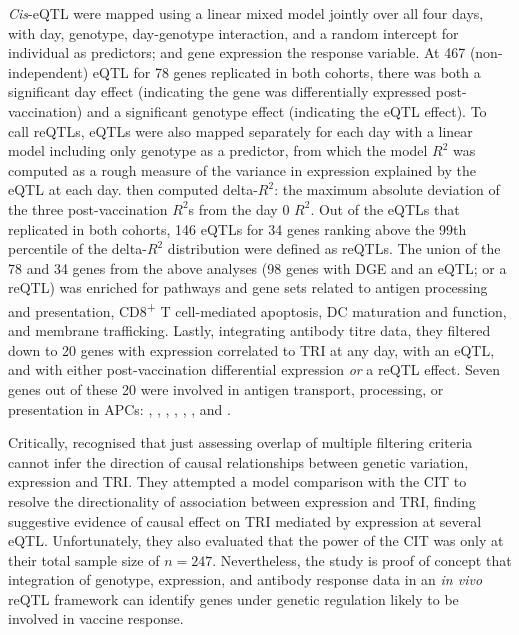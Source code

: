 \textit{Cis}-\gls{eQTL} were mapped using a linear mixed model jointly over all four days,
with day, genotype, day-genotype interaction, and a random intercept for individual as predictors; and gene expression the response variable.
At 467 (non-independent) \gls{eQTL} for 78 genes replicated in both cohorts,
there was both a significant day effect (indicating the gene was differentially expressed post-vaccination)
and a significant genotype effect (indicating the \gls{eQTL} effect).
To call \glspl{reQTL}, \glspl{eQTL} were also mapped separately for each day with a linear model including only genotype as a predictor,
from which the model $R^2$ was computed as a rough measure of the variance in expression explained by the \gls{eQTL} at each day.
\textcite{franco2013IntegrativeGenomicAnalysis} then computed delta-$R^2$: the maximum absolute deviation of the three post-vaccination $R^2$s from the day 0 $R^2$.
Out of the \glspl{eQTL} that replicated in both cohorts, 
146 \glspl{eQTL} for 34 genes ranking above the 99th percentile of the delta-$R^2$ distribution were defined as \glspl{reQTL}.
The union of the 78 and 34 genes from the above analyses (98 genes with \gls{DGE} and an \gls{eQTL}; or a \gls{reQTL}) was enriched for pathways and gene sets related to  
antigen processing and presentation, CD8\textsuperscript{+} T cell-mediated apoptosis, \gls{DC} maturation and function, and membrane trafficking.
%
Lastly, integrating antibody titre data,
they filtered down to 20 genes with expression correlated to \gls{TRI} at any day, 
with an \gls{eQTL}, 
and with either post-vaccination differential expression \emph{or} a \gls{reQTL} effect.
Seven genes out of these 20 were involved in antigen transport, processing, or presentation in \glspl{APC}:
, , , , , , and .

Critically, \textcite{franco2013IntegrativeGenomicAnalysis} recognised that just assessing overlap of multiple filtering criteria cannot infer the direction of causal relationships between genetic variation, expression and \gls{TRI}.
They attempted a model comparison with the CIT \autocite{millstein2009DisentanglingMolecularRelationships} to resolve the directionality of association between expression and \gls{TRI}, 
finding suggestive evidence of causal effect on \gls{TRI} mediated by expression at several \gls{eQTL}.
Unfortunately, they also evaluated that the power of the CIT was only  at their total sample size of $n=247$.
Nevertheless, the study is proof of concept that integration of genotype, expression, and antibody response data in an \textit{in vivo} \gls{reQTL} framework can identify genes under genetic regulation likely to be involved in vaccine response.

